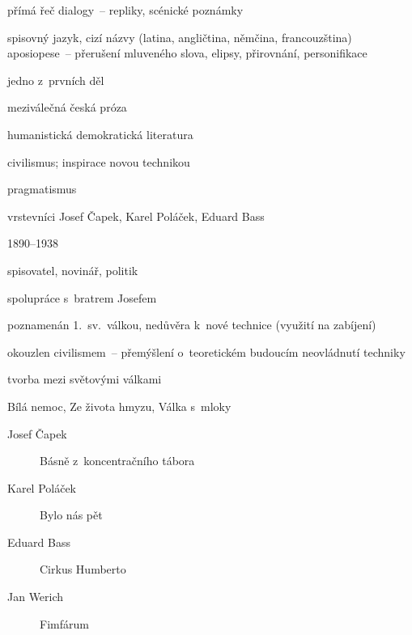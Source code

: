 { %
přímá řeč
dialogy~-- repliky, scénické poznámky

\newpart

spisovný jazyk, cizí názvy (latina, angličtina, němčina, francouzština)
aposiopese~-- přerušení mluveného slova, elipsy, přirovnání, personifikace

\begin{compactitem}
	\item jedno z~prvních děl
	\item meziválečná česká próza
	\item humanistická demokratická literatura
	\item civilismus; inspirace novou technikou
	\item pragmatismus
	\item vrstevníci Josef Čapek, Karel Poláček, Eduard Bass
\end{compactitem}

\parag{\getauthor}
\begin{compactitem}
	\item 1890--1938
	\item spisovatel, novinář, politik
	\item spolupráce s~bratrem Josefem
	\item poznamenán 1.~sv.~válkou, nedůvěra k~nové technice (využití na zabíjení)
	\item okouzlen civilismem~-- přemýšlení o~teoretickém budoucím neovládnutí
		techniky
	\item tvorba mezi světovými válkami
	\item Bílá nemoc, Ze života hmyzu, Válka s~mloky
\end{compactitem}

\begin{description}
	\item[Josef Čapek] Básně z~koncentračního tábora
	\item[Karel Poláček] Bylo nás pět
	\item[Eduard Bass] Cirkus Humberto
	\item[Jan Werich] Fimfárum
\end{description}
}
